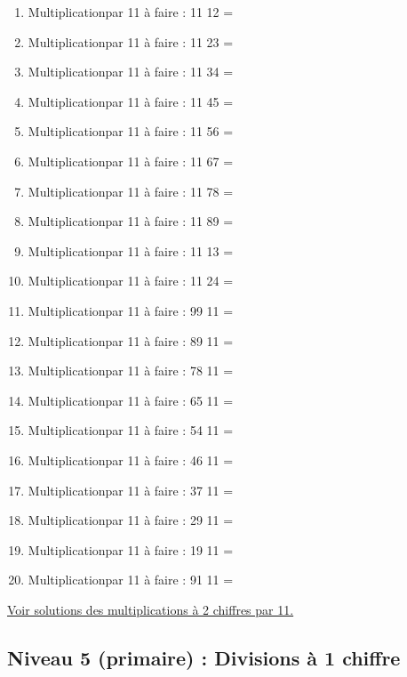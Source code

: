 \documentclass[11pt]{article}
\begin{document}
\begin{enumerate}
\item Multiplicationpar 11 à faire :  11\texttimes{} 12 =
\item Multiplicationpar 11 à faire :  11\texttimes{} 23 =
\item Multiplicationpar 11 à faire :  11\texttimes{} 34 =
\item Multiplicationpar 11 à faire :  11\texttimes{} 45 =
\item Multiplicationpar 11 à faire :  11\texttimes{} 56 =
\item Multiplicationpar 11 à faire :  11\texttimes{} 67 =
\item Multiplicationpar 11 à faire :  11\texttimes{} 78 =
\item Multiplicationpar 11 à faire :  11\texttimes{} 89 =
\item Multiplicationpar 11 à faire :  11\texttimes{} 13 =
\item Multiplicationpar 11 à faire :  11\texttimes{} 24 =
\item Multiplicationpar 11 à faire :  99\texttimes{} 11 =
\item Multiplicationpar 11 à faire :  89\texttimes{} 11 =
\item Multiplicationpar 11 à faire :  78\texttimes{} 11 =
\item Multiplicationpar 11 à faire :  65\texttimes{} 11 =
\item Multiplicationpar 11 à faire :  54\texttimes{} 11 =
\item Multiplicationpar 11 à faire :  46\texttimes{} 11 =
\item Multiplicationpar 11 à faire :  37\texttimes{} 11 =
\item Multiplicationpar 11 à faire :  29\texttimes{} 11 =
\item Multiplicationpar 11 à faire :  19\texttimes{} 11 =
\item Multiplicationpar 11 à faire :  91\texttimes{} 11 =
\end{enumerate}




\hyperref[org6ccdea9]{Voir solutions des multiplications à 2 chiffres par 11.}




\newpage


\subsection{Niveau 5 (primaire) : Divisions à 1 chiffre}
\label{sec:org9019233}
\label{org498049f}
\end{document}
